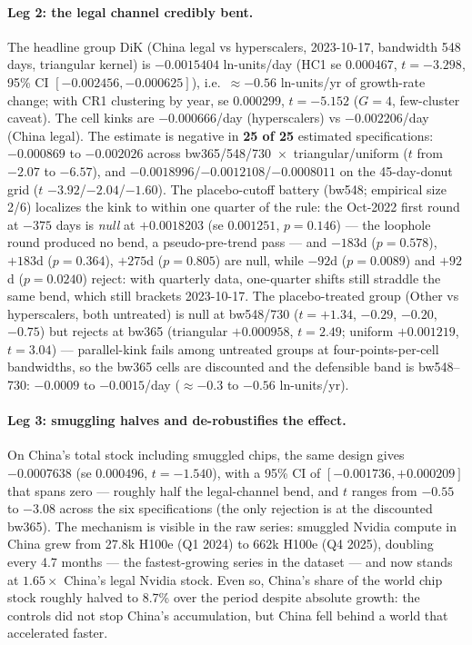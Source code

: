 \documentclass[11pt]{article}
\begin{document}
\paragraph{Leg 2: the legal channel credibly bent.} The headline group DiK
(China legal vs hyperscalers, 2023-10-17, bandwidth 548 days, triangular
kernel) is $-0.0015404$ ln-units/day (HC1 se $0.000467$, $t=-3.298$, 95\% CI
$[-0.002456, -0.000625]$), i.e.\ $\approx -0.56$ ln-units/yr of growth-rate
change; with CR1 clustering by year, se $0.000299$, $t=-5.152$ ($G=4$,
few-cluster caveat). The cell kinks are $-0.000666$/day (hyperscalers) vs
$-0.002206$/day (China legal). The estimate is negative in \textbf{25 of 25}
estimated specifications: $-0.000869$ to $-0.002026$ across
bw365/548/730~$\times$~triangular/uniform ($t$ from $-2.07$ to $-6.57$), and
$-0.0018996$/$-0.0012108$/$-0.0008011$ on the 45-day-donut grid ($t$
$-3.92$/$-2.04$/$-1.60$). The placebo-cutoff battery (bw548; empirical size
2/6) localizes the kink to within one quarter of the rule: the Oct-2022
first round at $-375$ days is \emph{null} at $+0.0018203$ (se $0.001251$,
$p=0.146$) --- the loophole round produced no bend, a pseudo-pre-trend pass
--- and $-183$d ($p=0.578$), $+183$d ($p=0.364$), $+275$d ($p=0.805$) are
null, while $-92$d ($p=0.0089$) and $+92$d ($p=0.0240$) reject: with
quarterly data, one-quarter shifts still straddle the same bend, which still
brackets 2023-10-17. The placebo-treated group (Other vs hyperscalers, both
untreated) is null at bw548/730 ($t=+1.34$, $-0.29$, $-0.20$, $-0.75$) but
rejects at bw365 (triangular $+0.000958$, $t=2.49$; uniform $+0.001219$,
$t=3.04$) --- parallel-kink fails among untreated groups at
four-points-per-cell bandwidths, so the bw365 cells are discounted and the
defensible band is bw548--730: $-0.0009$ to $-0.0015$/day ($\approx -0.3$ to
$-0.56$ ln-units/yr).

\paragraph{Leg 3: smuggling halves and de-robustifies the effect.} On
China's total stock including smuggled chips, the same design gives
$-0.0007638$ (se $0.000496$, $t=-1.540$), with a 95\% CI of
$[-0.001736, +0.000209]$ that spans zero --- roughly half the legal-channel
bend, and $t$ ranges from $-0.55$ to $-3.08$ across the six specifications
(the only rejection is at the discounted bw365). The mechanism is visible in the raw
series: smuggled Nvidia compute in China grew from 27.8k H100e (Q1 2024) to
662k H100e (Q4 2025), doubling every 4.7 months --- the fastest-growing
series in the dataset --- and now stands at $1.65\times$ China's legal Nvidia
stock. Even so, China's share of the world chip stock roughly halved to
8.7\% over the period despite absolute growth: the controls did not stop
China's accumulation, but China fell behind a world that accelerated
faster.
\end{document}
